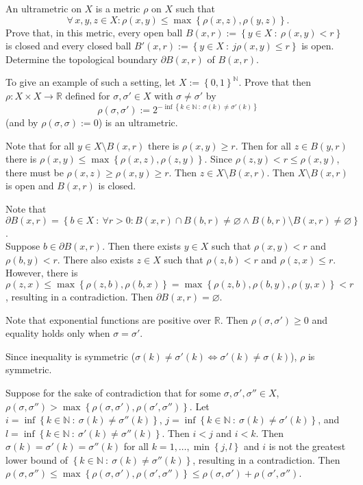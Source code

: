 \documentclass{homework}
\begin{document}
\problem An ultrametric on $X$ is a metric $\rho$ on $X$ such that 
\[
  \forall \, x, y, z \in X: \rho(x, y) \leq
    \max \left \{ \rho(x, z), \rho(y, z) \right \}.
\] 
Prove that, in this metric, every open ball 
$B(x, r) := \left \{ y \in X ~ : ~ \rho(x, y) < r \right \}$ is closed 
and every closed ball $B'(x, r) := \left \{ y \in X ~ : ~ 
j\rho(x, y) \leq r \right \}$ is open.
Determine the topological boundary $\partial B(x, r)$ of $B(x, r)$.

To give an example of such a setting, let $X := \left \{ 0, 1 \right \}^
{\mathbb N}$.
Prove that then $\rho : X \times X \to \mathbb R$ defined for 
$\sigma, \sigma' \in X$ with $\sigma \neq \sigma'$ by 
\[
  \rho(\sigma, \sigma') := %
    2^{-\inf\left \{ k \in \mathbb N ~ : ~ \sigma(k) \neq \sigma'(k) \right \}}
\]
(and by $\rho(\sigma, \sigma) := 0$) is an ultrametric.

  \solution Note that for all $y \in X \setminus B(x, r)$ there is 
    $\rho(x, y) \geq r$.
  Then for all $z \in B(y, r)$ there is $\rho(x, y) \leq 
    \max\left \{ \rho(x, z), \rho(z, y) \right \}$.
  Since $\rho(z, y) < r \leq \rho(x, y)$, there must be 
    $\rho(x, z) \geq \rho(x, y) \geq r$.
  Then $z \in X \setminus B(x, r)$.
  Then $X \setminus B(x, r)$ is open and $B(x, r)$ is closed.
    
  Note that $\partial B(x, r) = \left \{ b \in X ~ : ~ 
    \forall r > 0: B(x, r) \cap B(b, r) \neq  \varnothing \wedge 
    B(b, r) \setminus B(x, r) \neq \varnothing \right \}$. \\ 
  Suppose $b \in \partial B(x, r)$.
  Then there exists $y \in X$ such that $\rho(x, y) < r$ and $\rho(b, y) < r$.
  There also exists $z \in X$ such that $\rho(z, b) < r$ and 
    $\rho(z, x) \leq r$.
  However, there is $\rho(z, x) \leq 
    \max\left \{ \rho(z, b), \rho(b, x) \right \} = 
    \max\left \{ \rho(z, b), \rho(b, y), \rho(y, x) \right \} < r$, 
    resulting in a contradiction.
  Then $\partial B(x, r) = \varnothing$.
  
  Note that exponential functions are positive over $\mathbb R$.
  Then $\rho(\sigma, \sigma') \geq 0$ and equality holds only when 
    $\sigma = \sigma'$.

  Since inequality is symmetric ($\sigma(k) \neq \sigma'(k) \Leftrightarrow 
    \sigma'(k) \neq \sigma(k)$), $\rho$ is symmetric.

  Suppose for the sake of contradiction that for some $\sigma, \sigma', 
    \sigma'' \in X$, $\rho(\sigma, \sigma'') > 
    \max\left \{ \rho(\sigma, \sigma'), \rho(\sigma', \sigma'') \right \}$.
  Let $i = \inf\left \{ k \in \mathbb N ~ : ~ \sigma(k) \neq 
    \sigma''(k) \right \}$, $j = \inf\left \{ k \in \mathbb N ~ : ~ 
    \sigma(k) \neq \sigma'(k) \right \}$, and $l = 
    \inf\left \{ k \in \mathbb N ~ : ~ \sigma'(k) \neq \sigma''(k) \right \}$.
  Then $i < j$ and $i < k$.
  Then $\sigma(k) = \sigma'(k) = \sigma''(k)$ for all $k = 1, \dots, 
    \min\left \{ j, l \right \}$ and $i$ is not the greatest lower bound of 
    $\left \{ k \in \mathbb N ~ : ~ \sigma(k) \neq \sigma''(k) \right \}$, 
   resulting in a contradiction.
 Then $\rho(\sigma, \sigma'') \leq \max\left \{ \rho(\sigma, \sigma'), 
  \rho(\sigma', \sigma'') \right \} \leq \rho(\sigma, \sigma') + 
  \rho(\sigma', \sigma'')$.
  
\end{document}
